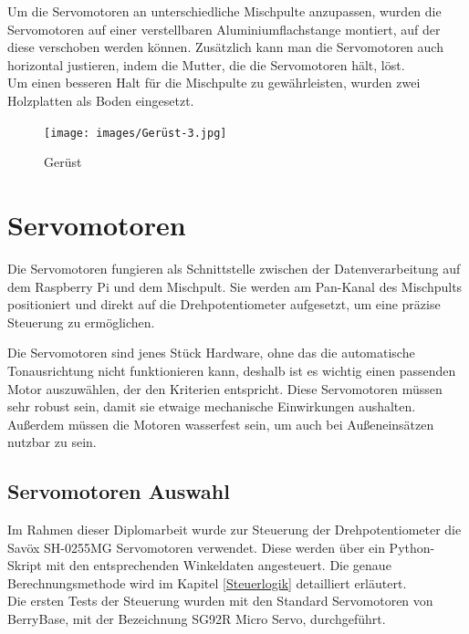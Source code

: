 \newpage
Um die Servomotoren an unterschiedliche Mischpulte anzupassen, wurden die Servomotoren auf einer verstellbaren Aluminiumflachstange montiert, auf der diese verschoben werden können. Zusätzlich kann man die Servomotoren auch horizontal justieren, indem die Mutter, die die Servomotoren hält, löst. \\
Um einen besseren Halt für die Mischpulte zu gewährleisten, wurden zwei Holzplatten als Boden eingesetzt.

\begin{figure}[H]
	\centering
	\texttt{[image: images/Gerüst-3.jpg]}
	\caption[Gerüst]{Gerüst}
	\label{fig:Gerüst-2}
\end{figure}


\section{Servomotoren}
Die Servomotoren fungieren als Schnittstelle zwischen der Datenverarbeitung auf dem Raspberry Pi und dem Mischpult. Sie werden am Pan-Kanal des Mischpults positioniert und direkt auf die Drehpotentiometer aufgesetzt, um eine präzise Steuerung zu ermöglichen.

Die Servomotoren sind jenes Stück Hardware, ohne das die automatische Tonausrichtung nicht funktionieren kann, deshalb ist es wichtig einen passenden Motor auszuwählen, der den Kriterien entspricht. Diese Servomotoren müssen sehr robust sein, damit sie etwaige mechanische Einwirkungen aushalten. Außerdem müssen die Motoren wasserfest sein, um auch bei Außeneinsätzen nutzbar zu sein. 

\newpage
\subsection{Servomotoren Auswahl}

Im Rahmen dieser Diplomarbeit wurde zur Steuerung der Drehpotentiometer die Savöx SH-0255MG Servomotoren verwendet. Diese werden über ein Python-Skript mit den entsprechenden Winkeldaten angesteuert. Die genaue Berechnungsmethode wird im Kapitel \ref{Steuerlogik} detailliert erläutert.\\
Die ersten Tests der Steuerung wurden mit den Standard Servomotoren von BerryBase, mit der Bezeichnung SG92R Micro Servo, durchgeführt.


